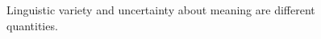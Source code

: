 \begin{figure}[H]
\centering
{}
\caption{Linguistic variety and uncertainty about meaning are different quantities.}\label{fig:teach-M05-09}
\end{figure}
